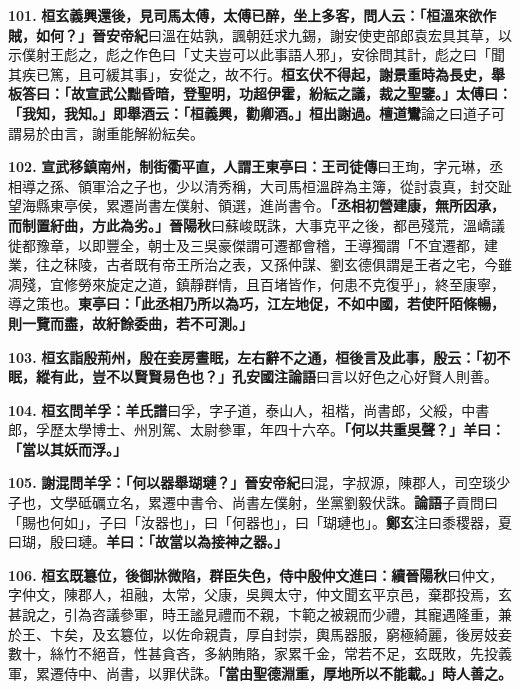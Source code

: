 \textbf{101.} \textbf{桓玄義興還後，見司馬太傅，太傅已醉，坐上多客，問人云：「桓溫來欲作賊，如何？」}{\footnotesize \textbf{晉安帝紀}曰溫在姑孰，諷朝廷求九錫，謝安使吏部郎袁宏具其草，以示僕射王彪之，彪之作色曰「丈夫豈可以此事語人邪」，安徐問其計，彪之曰「聞其疾已篤，且可緩其事」，安從之，故不行。}\textbf{桓玄伏不得起，謝景重時為長史，舉板答曰：「故宣武公黜昏暗，登聖明，功超伊霍，紛紜之議，裁之聖鑒。」太傅曰：「我知，我知。」即舉酒云：「桓義興，勸卿酒。」桓出謝過。}{\footnotesize \textbf{檀道鸞}論之曰道子可謂易於由言，謝重能解紛紜矣。}

\textbf{102.} \textbf{宣武移鎮南州，制街衢平直，人謂王東亭曰：}{\footnotesize \textbf{王司徒傳}曰王珣，字元琳，丞相導之孫、領軍洽之子也，少以清秀稱，大司馬桓溫辟為主簿，從討袁真，封交趾望海縣東亭侯，累遷尚書左僕射、領選，進尚書令。}\textbf{「丞相初營建康，無所因承，而制置紆曲，方此為劣。」}{\footnotesize \textbf{晉陽秋}曰蘇峻既誅，大事克平之後，都邑殘荒，溫嶠議徙都豫章，以即豐全，朝士及三吳豪傑謂可遷都會稽，王導獨謂「不宜遷都，建業，往之秣陵，古者既有帝王所治之表，又孫仲謀、劉玄德俱謂是王者之宅，今雖凋殘，宜修勞來旋定之道，鎮靜群情，且百堵皆作，何患不克復乎」，終至康寧，導之策也。}\textbf{東亭曰：「此丞相乃所以為巧，江左地促，不如中國，若使阡陌條暢，則一覽而盡，故紆餘委曲，若不可測。」}

\textbf{103.} \textbf{桓玄詣殷荊州，殷在妾房晝眠，左右辭不之通，桓後言及此事，殷云：「初不眠，縱有此，豈不以賢賢易色也？」}{\footnotesize \textbf{孔安國注論語}曰言以好色之心好賢人則善。}

\textbf{104.} \textbf{桓玄問羊孚：}{\footnotesize \textbf{羊氏譜}曰孚，字子道，泰山人，祖楷，尚書郎，父綏，中書郎，孚歷太學博士、州別駕、太尉參軍，年四十六卒。}\textbf{「何以共重吳聲？」羊曰：「當以其妖而浮。」}

\textbf{105.} \textbf{謝混問羊孚：「何以器舉瑚璉？」}{\footnotesize \textbf{晉安帝紀}曰混，字叔源，陳郡人，司空琰少子也，文學砥礪立名，累遷中書令、尚書左僕射，坐黨劉毅伏誅。\textbf{論語}子貢問曰「賜也何如」，子曰「汝器也」，曰「何器也」，曰「瑚璉也」。\textbf{鄭玄}注曰黍稷器，夏曰瑚，殷曰璉。}\textbf{羊曰：「故當以為接神之器。」}

\textbf{106.} \textbf{桓玄既簒位，後御牀微陷，群臣失色，侍中殷仲文進曰：}{\footnotesize \textbf{續晉陽秋}曰仲文，字仲文，陳郡人，祖融，太常，父康，吳興太守，仲文聞玄平京邑，棄郡投焉，玄甚說之，引為咨議參軍，時王謐見禮而不親，卞範之被親而少禮，其寵遇隆重，兼於王、卞矣，及玄簒位，以佐命親貴，厚自封崇，輿馬器服，窮極綺麗，後房妓妾數十，絲竹不絕音，性甚貪吝，多納賄賂，家累千金，常若不足，玄既敗，先投義軍，累遷侍中、尚書，以罪伏誅。}\textbf{「當由聖德淵重，厚地所以不能載。」時人善之。}


